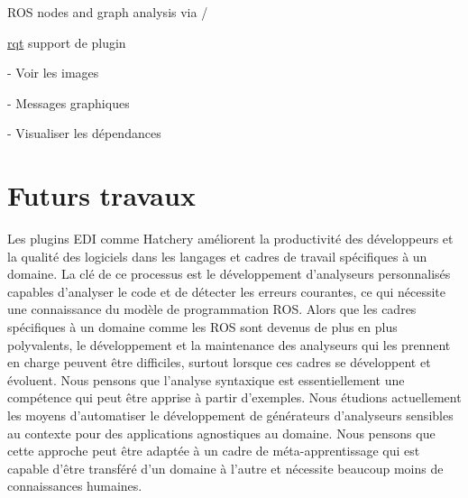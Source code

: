 \begin{multicols}{2}
\begin{todolist}
\begin{todolist}
\item ROS nodes and graph analysis via \href{https://wiki.ros.org/rosdep}{}/\href{https://wiki.ros.org/rqt_dep}{}
\end{todolist}
\item[\done] \href{https://wiki.ros.org/rqt}{rqt} support de plugin
\begin{todolist}
\item[\done] \href{https://wiki.ros.org/rqt_image_view}{} - Voir les images
\item[\done] \href{https://wiki.ros.org/rqt_graph}{} - Messages graphiques
\item[\done] \href{https://wiki.ros.org/rqt_dep}{} - Visualiser les dépendances
\end{todolist}
\end{todolist}
\end{multicols}

\section{Futurs travaux}

Les plugins EDI comme Hatchery améliorent la productivité des développeurs et la qualité des logiciels dans les langages et cadres de travail spécifiques à un domaine. La clé de ce processus est le développement d'analyseurs personnalisés capables d'analyser le code et de détecter les erreurs courantes, ce qui nécessite une connaissance du modèle de programmation ROS. Alors que les cadres spécifiques à un domaine comme les ROS sont devenus de plus en plus polyvalents, le développement et la maintenance des analyseurs qui les prennent en charge peuvent être difficiles, surtout lorsque ces cadres se développent et évoluent. Nous pensons que l'analyse syntaxique est essentiellement une compétence qui peut être apprise à partir d'exemples. Nous étudions actuellement les moyens d'automatiser le développement de générateurs d'analyseurs sensibles au contexte pour des applications agnostiques au domaine. Nous pensons que cette approche peut être adaptée à un cadre de méta-apprentissage qui est capable d'être transféré d'un domaine à l'autre et nécessite beaucoup moins de connaissances humaines.

